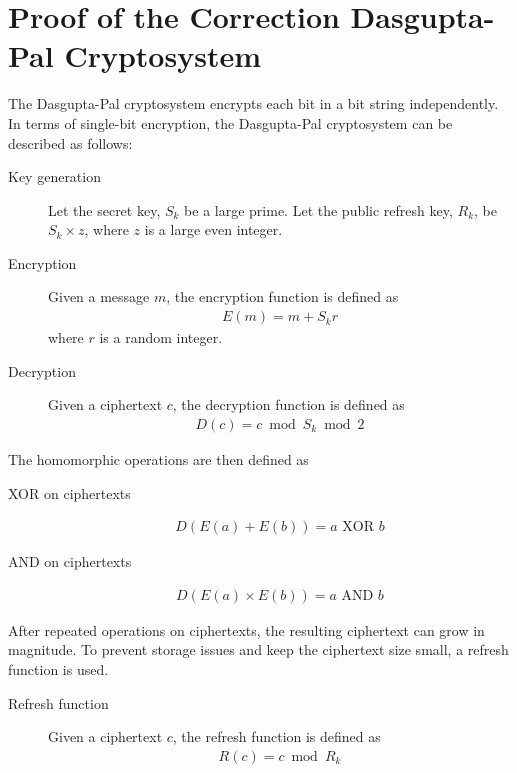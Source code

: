 \section{Proof of the Correction Dasgupta-Pal Cryptosystem}
The Dasgupta-Pal cryptosystem encrypts each bit in a bit string independently.
In terms of single-bit encryption, the Dasgupta-Pal cryptosystem can be described as follows:
\begin{description}
	\item[Key generation]
	Let the secret key, $S_k$ be a large prime.
	Let the public refresh key, $R_k$, be $S_k \times z$, where $z$ is a large even integer.
	\item[Encryption]
	Given a message $m$, the encryption function is defined as
	\begin{align*}
		E(m) = m + S_kr
	\end{align*}
	where $r$ is a random integer.
	\item[Decryption]
	Given a ciphertext $c$, the decryption function is defined as
	\begin{align*}
		D(c) = c \bmod S_k \bmod 2
	\end{align*}
\end{description}
The homomorphic operations are then defined as
\begin{description}
	\item[XOR on ciphertexts]
	\begin{align*}
		D(E(a)+E(b)) = a \text{ XOR } b
	\end{align*}
	\item[AND on ciphertexts]
	\begin{align*}
		D(E(a)\times E(b)) = a \text{ AND } b
	\end{align*}
\end{description}
After repeated operations on ciphertexts, the resulting ciphertext can grow in magnitude.
To prevent storage issues and keep the ciphertext size small, a refresh function is used.
\begin{description}
	\item[Refresh function]
	Given a ciphertext $c$, the refresh function is defined as
	\begin{align*}
		R(c) = c \bmod R_k
	\end{align*}
\end{description}

